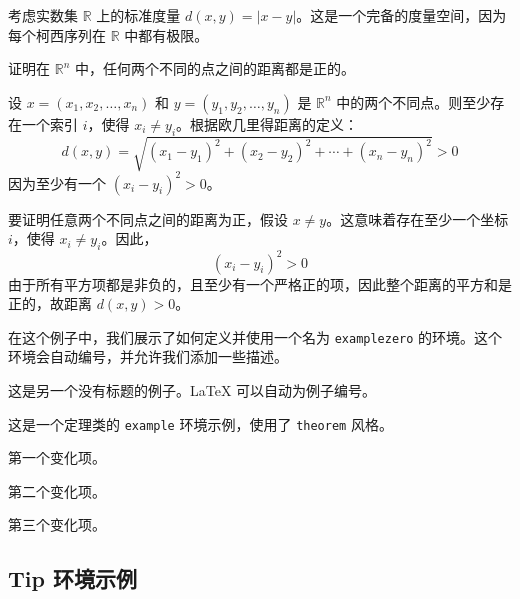 \documentclass[12pt, a4paper, oneside, UTF8]{ctexbook}
\begin{document}
	\begin{example}
		考虑实数集 $\mathbb{R}$ 上的标准度量 $d(x, y) = |x - y|$。这是一个完备的度量空间，因为每个柯西序列在 $\mathbb{R}$ 中都有极限。
	\end{example}
	
	\begin{problem}
		证明在 $\mathbb{R}^n$ 中，任何两个不同的点之间的距离都是正的。
	\end{problem}
	
	\begin{answer}
		设 $x = (x_1, x_2, \ldots, x_n)$ 和 $y = (y_1, y_2, \ldots, y_n)$ 是 $\mathbb{R}^n$ 中的两个不同点。则至少存在一个索引 $i$，使得 $x_i \neq y_i$。根据欧几里得距离的定义：
		\[
		d(x, y) = \sqrt{(x_1 - y_1)^2 + (x_2 - y_2)^2 + \cdots + (x_n - y_n)^2} > 0
		\]
		因为至少有一个 $(x_i - y_i)^2 > 0$。
	\end{answer}
	
	\begin{solution}
		要证明任意两个不同点之间的距离为正，假设 $x \neq y$。这意味着存在至少一个坐标 $i$，使得 $x_i \neq y_i$。因此，
		\[
		(x_i - y_i)^2 > 0
		\]
		由于所有平方项都是非负的，且至少有一个严格正的项，因此整个距离的平方和是正的，故距离 $d(x, y) > 0$。
	\end{solution}
	
	
	\begin{examplezero}[这是一个简单的例子]
		在这个例子中，我们展示了如何定义并使用一个名为 \texttt{examplezero} 的环境。这个环境会自动编号，并允许我们添加一些描述。
	\end{examplezero}
	
	\begin{examplezero}
		这是另一个没有标题的例子。LaTeX 可以自动为例子编号。
	\end{examplezero}
	
	
	\begin{example}
		这是一个定理类的 \texttt{example} 环境示例，使用了 \texttt{theorem} 风格。
	\end{example}


	\begin{change}
		\item 第一个变化项。
		\item 第二个变化项。
		\item 第三个变化项。
	\end{change}
	
	\subsection{Tip 环境示例}
	
\end{document}
